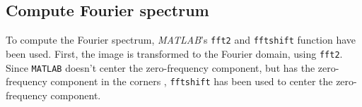 \subsection{Compute Fourier spectrum}
To compute the Fourier spectrum, \textit{MATLAB}'s \texttt{fft2} and \texttt{fftshift} function have been used.
First, the image is transformed to the Fourier domain, using \texttt{fft2}.
Since \texttt{MATLAB} doesn't center the zero-frequency component, but has the zero-frequency component in the corners \cite{fftshift}, \texttt{fftshift} has been used to center the zero-frequency component.

\clearpage